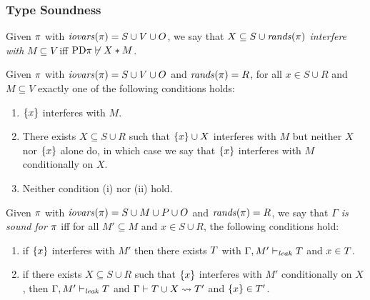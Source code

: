 \subsubsection{Type Soundness}

\begin{definition}
  Given $\pi$ with $\mathit{iovars}(\pi) = S \cup V \cup O$, we say that
  $X \subseteq S \cup \mathit{rands}(\pi)$ \emph{interfere with} 
  $M \subseteq V$ iff $\mathrm{PD}{\pi} \not\vdash X * M$.
\end{definition}

\begin{lemma}
  Given $\pi$ with $\mathit{iovars}(\pi) = S \cup V \cup O$ and $\mathit{rands}(\pi) = R$,
  for all $x \in S \cup R$ and $M \subseteq V$ exactly one of the following conditions holds:
  \begin{enumerate}[\hspace{5mm}i.]
  \item $\{ x \}$ interferes with $M$.
  \item There exists $X \subseteq S \cup R$ such that $\{ x \} \cup X$ interferes
    with $M$ but neither $X$ nor $\{ x \}$ alone do, in which case we say
    that $\{ x \}$ interferes with $M$ conditionally on $X$.
  \item Neither condition (i) nor (ii) hold.
  \end{enumerate}
\end{lemma}


\begin{definition}
  \label{definition-sound}
  Given $\pi$ with $\mathit{iovars}(\pi) = S \cup M \cup P \cup O$
  and $\mathit{rands}(\pi) = R$, we say that
  \emph{$\Gamma$ is sound for $\pi$} iff for all $M' \subseteq M$
      and $x \in S \cup R$, the following
      conditions hold:
  \begin{enumerate}[\hspace{5mm}i.]
    \item  if $\{ x \}$ interferes with $M'$ then
      there exists $T$ with $\Gamma,M' \vdash_{\mathit{leak}} T$ and $x \in T$.
    \item  if there exists  $X \subseteq S \cup R$ such that
      $\{ x \}$ interferes with $M'$ conditionally on $X$,
      then $\Gamma,M' \vdash_{\mathit{leak}} T$ and
      $\Gamma \vdash T \cup X \leadsto T'$ and
      $\{ x \} \in T'$.
  \end{enumerate}
\end{definition}

